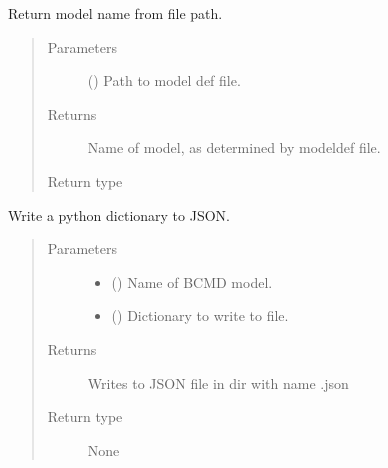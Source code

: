 \documentclass[letterpaper,10pt,english]{sphinxmanual}
\begin{document}
\begin{fulllineitems}
\label{\detokenize{jsonParsing:bayescmd.jsonParsing.modelJSON.get_model_name}}
Return model name from file path.
\begin{quote}\begin{description}
\item[{Parameters}] \leavevmode
{} () \textendash{} Path to model def file.

\item[{Returns}] \leavevmode
Name of model, as determined by modeldef file.

\item[{Return type}] \leavevmode
{}

\end{description}\end{quote}

\end{fulllineitems}


\begin{fulllineitems}
\label{\detokenize{jsonParsing:bayescmd.jsonParsing.modelJSON.json_writer}}
Write a python dictionary to JSON.
\begin{quote}\begin{description}
\item[{Parameters}] \leavevmode\begin{itemize}
\item {} 
 () \textendash{} Name of BCMD model.

\item {} 
 () \textendash{} Dictionary to write to file.

\end{itemize}

\item[{Returns}] \leavevmode
Writes to JSON file in  dir with name .json

\item[{Return type}] \leavevmode
None

\end{description}\end{quote}

\end{fulllineitems}
\end{document}
